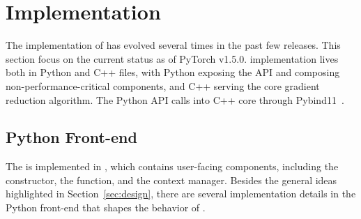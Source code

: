 \section{Implementation}\label{sec:impl}





The implementation of  has evolved several times in the past few releases. This section focus on the current status as of PyTorch v1.5.0.  implementation lives both in Python and C++ files, with Python exposing the API and composing non-performance-critical components, and C++ serving the core gradient reduction algorithm. The Python API calls into C++ core through Pybind11~\cite{pybind}.

\subsection{Python Front-end}

The   is implemented in , which contains user-facing components, including the constructor, the  function, and the  context manager. Besides the general ideas highlighted in Section~\ref{sec:design}, there are several implementation details in the Python front-end that shapes the behavior of .


